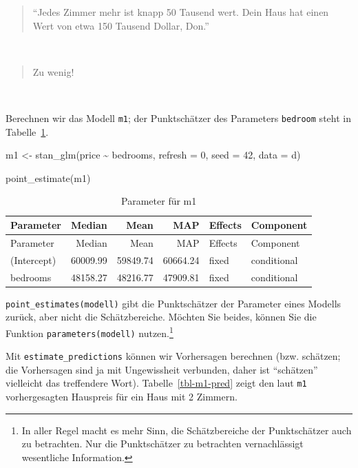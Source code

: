 \documentclass[
  a4paper,
  DIV=11]{scrreprt}
\newenvironment{Shaded}{\begin{snugshade}}{\end{snugshade}}
\newcommand{\AttributeTok}[1]{\textcolor[rgb]{0.40,0.45,0.13}{#1}}
\newcommand{\DecValTok}[1]{\textcolor[rgb]{0.68,0.00,0.00}{#1}}
\newcommand{\FunctionTok}[1]{\textcolor[rgb]{0.28,0.35,0.67}{#1}}
\newcommand{\NormalTok}[1]{\textcolor[rgb]{0.00,0.23,0.31}{#1}}
\newcommand{\OtherTok}[1]{\textcolor[rgb]{0.00,0.23,0.31}{#1}}
\newcommand{\SpecialCharTok}[1]{\textcolor[rgb]{0.37,0.37,0.37}{#1}}
\theoremstyle{definition}
\theoremstyle{remark}
\begin{document}
\begin{quote}
``Jedes Zimmer mehr ist knapp 50 Tausend wert. Dein Haus hat einen Wert
von etwa 150 Tausend Dollar, Don.''
\end{quote}

👩

\begin{quote}
Zu wenig! 🤬
\end{quote}

🧑

Berechnen wir das Modell \texttt{m1}; der Punktschätzer des Parameters
\texttt{bedroom} steht in Tabelle~\ref{tbl-m1-hdi}.

\begin{Shaded}
\begin{Highlighting}[]
\NormalTok{m1 }\OtherTok{\textless{}{-}} \FunctionTok{stan\_glm}\NormalTok{(price }\SpecialCharTok{\textasciitilde{}}\NormalTok{ bedrooms,}
               \AttributeTok{refresh =} \DecValTok{0}\NormalTok{,}
               \AttributeTok{seed =} \DecValTok{42}\NormalTok{,}
               \AttributeTok{data =}\NormalTok{ d)}

\FunctionTok{point\_estimate}\NormalTok{(m1)}
\end{Highlighting}
\end{Shaded}

\hypertarget{tbl-m1-hdi}{}
\begin{longtable}[]{@{}lrrrll@{}}
\caption{\label{tbl-m1-hdi}Parameter für m1}\tabularnewline
\toprule()
Parameter & Median & Mean & MAP & Effects & Component \\
\midrule()
\endfirsthead
\toprule()
Parameter & Median & Mean & MAP & Effects & Component \\
\midrule()
\endhead
(Intercept) & 60009.99 & 59849.74 & 60664.24 & fixed & conditional \\
bedrooms & 48158.27 & 48216.77 & 47909.81 & fixed & conditional \\
\bottomrule()
\end{longtable}

\texttt{point\_estimates(modell)} gibt die Punktschätzer der Parameter
eines Modells zurück, aber nicht die Schätzbereiche. Möchten Sie beides,
können Sie die Funktion \texttt{parameters(modell)} nutzen.\footnote{In
  aller Regel macht es mehr Sinn, die Schätzbereiche der Punktschätzer
  auch zu betrachten. Nur die Punktschätzer zu betrachten vernachlässigt
  wesentliche Information.}

Mit \texttt{estimate\_predictions} können wir Vorhersagen berechnen
(bzw. schätzen; die Vorhersagen sind ja mit Ungewissheit verbunden,
daher ist ``schätzen'' vielleicht das treffendere Wort).
Tabelle~\ref{tbl-m1-pred} zeigt den laut \texttt{m1} vorhergesagten
Hauspreis für ein Haus mit 2 Zimmern.
\end{document}
